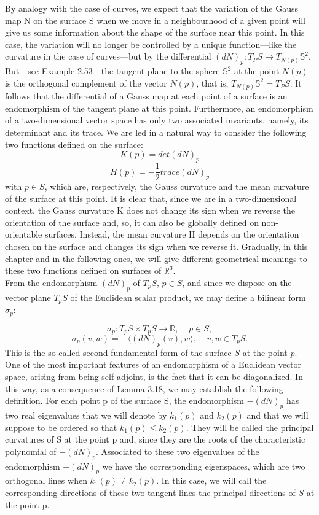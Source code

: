 By analogy with the case of curves, we expect that the variation of the Gauss map N on the surface S when we move in a neighbourhood of a given point will give us some information about the shape of the surface near this point. In this case, the variation will no longer be controlled by a unique function—like the curvature in the case of curves—but by the differential $(dN)_p : T_P S \to T_{N(p)} \mathbb{S}^2$. But—see Example 2.53—the tangent plane to the sphere $\mathbb{S}^2$ at the point $N(p)$ is the orthogonal complement of the vector $N(p)$, that is, $T_{N(p)} \mathbb{S}^2 = T_P S$. It follows that the differential of a Gauss map at each point of a surface is an endomorphism of the tangent plane at this point. Furthermore, an endomorphism of a two-dimensional vector space has only two associated invariants, namely, its determinant and its trace. We are led in a natural way to consider the following two functions defined on the surface:
${ }$\\

$$ K(p) = det(dN)_p $$
$$ H(p) = - \frac{1}{2} trace(dN)_p $$
with $p \in S$,
which are, respectively, the Gauss curvature and the mean curvature of the surface at this point. It is clear that, since we are in a two-dimensional context, the Gauss curvature K does not change its sign when we reverse the orientation of the surface and, so, it can also be globally defined on non-orientable surfaces. Instead, the mean curvature H depends on the orientation chosen on the surface and changes its sign when we reverse it. Gradually, in this chapter and in the following ones, we will give different geometrical meanings to these two functions defined on surfaces of $\mathbb{R}^3$.
${ }$\\

From the endomorphism $(dN)_p$ of $T_pS$, $p \in S$, and since we dispose on the vector plane $T_pS$ of the Euclidean scalar product, we may define a bilinear form $\sigma_p$:

$$ \sigma_p : T_pS \times T_pS \to \mathbb{R}, \;\;\;\; p \in S, $$
$$ \sigma_p(v,w) = - \langle (dN)_p(v), w \rangle, \;\;\;\; v,w \in T_pS. $$
This is the so-called second fundamental form of the surface $S$ at the point
$p$.
${ }$\\

One of the most important features of an endomorphism of a Euclidean vector space, arising from being self-adjoint, is the fact that it can be diagonalized. In this way, as a consequence of Lemma 3.18, we may establish the following definition. For each point p of the surface S, the endomorphism $-(dN)_p$ has two real eigenvalues that we will denote by $k_1(p)$ and $k_2(p)$ and that we will suppose to be ordered so that $k_1(p) \leq k_2(p)$. They will be called the principal curvatures of S at the point p and, since they are the roots of the characteristic polynomial of $-(dN)_p$. Associated to these two eigenvalues of the endomorphism $-(dN)_p$ we have the corresponding eigenspaces, which are two orthogonal lines when $k_1(p) \neq k_2(p)$. In this case, we will call the corresponding directions of these two tangent lines the principal directions of $S$ at the point p.
${ }$\\
${ }$\\

